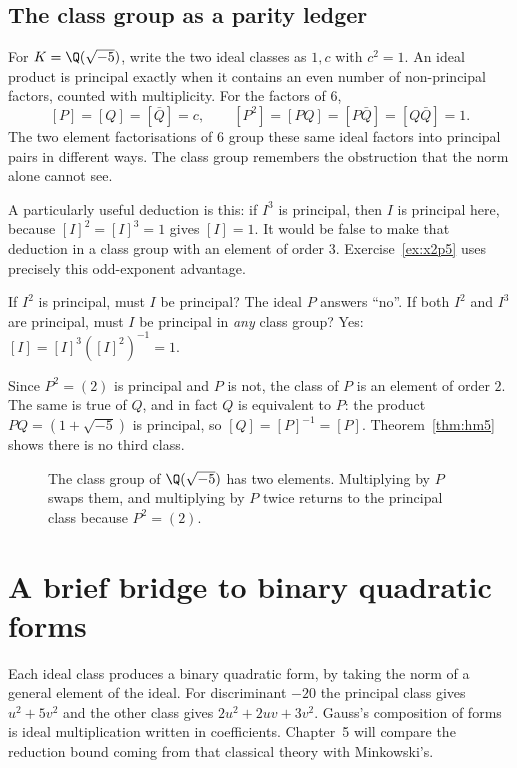 \subsection*{The class group as a parity ledger}
For $K=\Q(\sqrt{-5})$, write the two ideal classes as $1,c$ with $c^2=1$.
An ideal product is principal exactly when it contains an even number of
non-principal factors, counted with multiplicity. For the factors of $6$,
\[
[P]=[Q]=[\bar Q]=c,\qquad
[P^2]=[PQ]=[P\bar Q]=[Q\bar Q]=1.
\]
The two element factorisations of $6$ group these same ideal factors into
principal pairs in different ways. The class group remembers the obstruction
that the norm alone cannot see.

A particularly useful deduction is this: if $I^3$ is principal, then $I$ is
principal here, because $[I]^2=[I]^3=1$ gives $[I]=1$.
It would be false to make that deduction in a class group with an element of
order $3$. Exercise~\ref{ex:x2p5} uses precisely this odd-exponent advantage.

\begin{think}
If $I^2$ is principal, must $I$ be principal? The ideal $P$ answers ``no''.
If both $I^2$ and $I^3$ are principal, must $I$ be principal in \emph{any}
class group? Yes: $[I]=[I]^3([I]^2)^{-1}=1$.
\end{think}

\begin{examplex}
Since $P^2=(2)$ is principal and $P$ is not, the class of $P$ is an element of order $2$. The same is true of $Q$, and in fact $Q$ is equivalent to $P$: the product $PQ=(1+\sqrt{-5})$ is principal, so $[Q]=[P]^{-1}=[P]$. Theorem~\ref{thm:hm5} shows there is no third class.
\end{examplex}

\begin{figure}[ht]
\centering
{}
\caption{The class group of $\Q(\sqrt{-5})$ has two elements. Multiplying by $P$ swaps them, and multiplying by $P$ twice returns to the principal class because $P^2=(2)$.}
\label{fig:t1-classes}
\end{figure}


\section{A brief bridge to binary quadratic forms}

Each ideal class produces a binary quadratic form, by taking the norm of a general element of the ideal. For discriminant $-20$ the principal class gives $u^2+5v^2$ and the other class gives $2u^2+2uv+3v^2$. Gauss's composition of forms is ideal multiplication written in coefficients. Chapter~5 will compare the reduction bound coming from that classical theory with Minkowski's.

